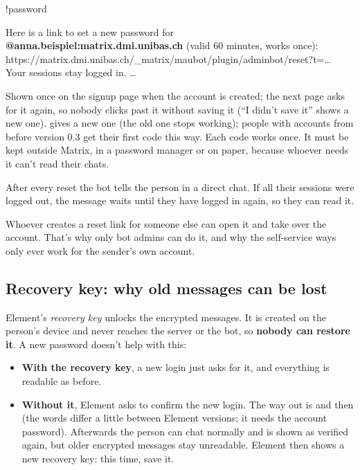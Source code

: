 \begin{you}
!password
\end{you}
\begin{botreply}
Here is a link to set a new password for \textbf{@anna.beispiel:matrix.dmi.unibas.ch}
(valid 60 minutes, works once):\\
https://matrix.dmi.unibas.ch/\_matrix/maubot/plugin/adminbot/reset?t=\dots\\[4pt]
Your sessions stay logged in. \dots
\end{botreply}

\begin{description}[style=nextline,leftmargin=1.5em,font=\normalfont\bfseries]
  \item[Reset code]
    Shown once on the signup page when the account is created; the next page asks for it
    again, so nobody clicks past it without saving it (\enquote{I didn't save it} shows a new
    one).  gives a
    new one (the old one stops working); people with accounts from before version 0.3 get
    their first code this way. Each code works once. It must be kept outside Matrix, in a
    password manager or on paper, because whoever needs it can't read their chats.
  \item[Notices]
    After every reset the bot tells the person in a direct chat. If all their sessions were
    logged out, the message waits until they have logged in again, so they can read it.
  \item[Why professors can't reset students' passwords]
    Whoever creates a reset link for someone else can open it and take over the account.
    That's why only bot admins can do it, and why the self-service ways only ever work for
    the sender's own account.
\end{description}

\subsection{Recovery key: why old messages can be lost}

Element's \emph{recovery key} unlocks the encrypted messages. It is created on the person's
device and never reaches the server or the bot, so \textbf{nobody can restore it}. A new
password doesn't help with this:

\begin{itemize}
  \item \textbf{With the recovery key}, a new login just asks for it, and everything is
        readable as before.
  \item \textbf{Without it}, Element asks to confirm the new login. The way out is
         and then  (the words differ a little between
        Element versions; it needs the account password). Afterwards the person can chat
        normally and is shown as verified again, but older encrypted messages stay
        unreadable. Element then shows a new recovery key: this time, save it.
\end{itemize}

